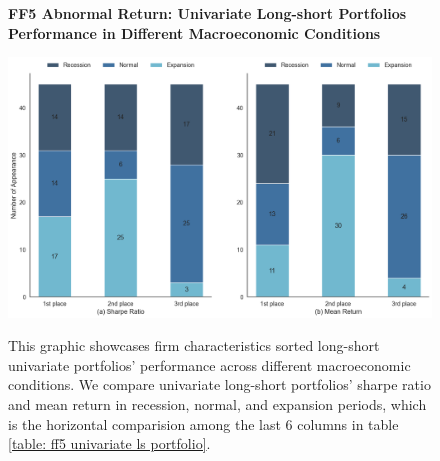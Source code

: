 \begin{figure}[H]
  \centering
  \caption{\textbf{FF5 Abnormal Return: Univariate Long-short Portfolios Performance in Different Macroeconomic Conditions}}
  \includegraphics[width=.8\textwidth]{images/univariant_ls_ff5_comparing.png}
  \label{fig: ff5 univariate ls comparing}
  \caption*{\footnotesize{This graphic showcases firm characteristics sorted long-short univariate portfolios' performance across different macroeconomic conditions. We compare univariate long-short portfolios' sharpe ratio and mean return in recession, normal, and expansion periods, which is the horizontal comparision among the last 6 columns in table \ref{table: ff5 univariate ls portfolio}.}}
\end{figure}